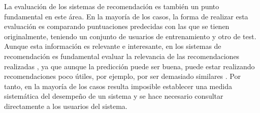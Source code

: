 La evaluación de los sistemas de recomendación es también un punto fundamental en este área. En la mayoría de los casos, la forma de realizar esta evaluación es comparando puntuaciones predecidas con las que se tienen originalmente, teniendo un conjunto de usuarios de entrenamiento y otro de test. Aunque esta información es relevante e interesante, en los sistemas de recomendación es fundamental evaluar la relevancia de las recomendaciones realizadas \cite{herlocker}, ya que aunque la predicción puede ser buena, puede estar realizando recomendaciones poco útiles, por ejemplo, por ser demasiado similares \cite{ziegler}. Por tanto, en la mayoría de los casos resulta imposible establecer una medida sistemática del desempeño de un sistema y se hace necesario consultar directamente a los usuarios del sistema.